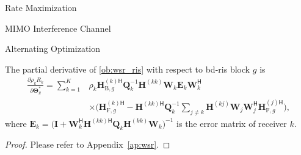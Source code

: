 \documentclass[journal]{IEEEtran}
\begin{document}
\begin{section}{Rate Maximization}
\begin{subsection}{MIMO Interference Channel}
\begin{subsubsection}{Alternating Optimization}
				\begin{lemma}
					\label{lm:wsr}
					The partial derivative of \eqref{ob:wsr_ris} with respect to \gls{bd}-\gls{ris} block $g$ is
					\begin{equation}
						\label{eq:gradient_eucl_wsr}
						\begin{split}
							\frac{\partial \rho_k R_k}{\partial \mathbf{\Theta}_g^*} = \sum_{k=1}^K & \rho_k {\mathbf{H}^{(k)\mathsf{H}}_{\mathrm{B},g}} \mathbf{Q}_k^{-1} {\mathbf{H}^{(kk)}} \mathbf{W}_k \mathbf{E}_k \mathbf{W}_k^\mathsf{H} \\
							& \times \bigl({\mathbf{H}_{\mathrm{F},g}^{(k)\mathsf{H}}} - {\mathbf{H}^{(kk)\mathsf{H}}} \mathbf{Q}_k^{-1} \sum_{j \ne k} {\mathbf{H}^{(kj)}} \mathbf{W}_j \mathbf{W}_j^\mathsf{H} {\mathbf{H}^{(j)\mathsf{H}}_{\mathrm{F},g}}\bigr),
						\end{split}
					\end{equation}
					where $\mathbf{E}_k = \bigl(\mathbf{I} + {\mathbf{W}_k^\mathsf{H}} {\mathbf{H}^{(kk)\mathsf{H}}} \mathbf{Q}_k {\mathbf{H}^{(kk)}} \mathbf{W}_k\bigr)^{-1}$ is the error matrix of receiver $k$.
				\end{lemma}

				\begin{proof}
					Please refer to Appendix~\ref{ap:wsr}.
				\end{proof}


\end{subsubsection}
\end{subsection}
\end{section}
\end{document}

